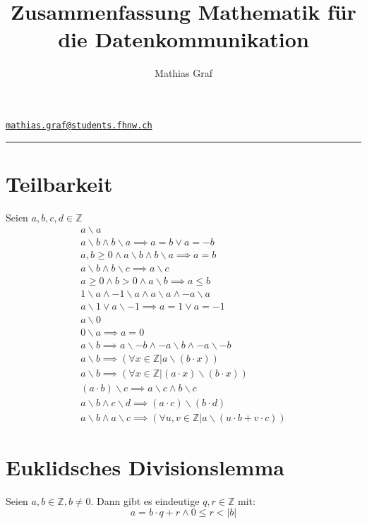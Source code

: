 \documentclass[a4paper, ngerman, landscape, fleqn]{article}
\title{Zusammenfassung Mathematik für die Datenkommunikation}
\author{Mathias Graf}
\makeatletter
\def\email{\href{mailto:mathias.graf@students.fhnw.ch}{\texttt{mathias.graf@students.fhnw.ch}}}
\makeatother
\begin{document}
\makeatletter
{\Large \textbf{\@title}}
\hfill
{\@author}
\hfill
\email
\makeatother
\hrule

\begin{multicols*}{3}

\section*{Teilbarkeit}
Seien $a, b, c, d \in \mathbb{Z}$
\begin{align}
    a \backslash a \\
    a \backslash b \wedge b \backslash a \implies a = b \vee a = -b \\
    a, b \geq 0 \wedge a \backslash b \wedge b \backslash a \implies a = b \\
    a \backslash b \wedge b \backslash c \implies a \backslash c \\
    a \geq 0 \wedge b > 0 \wedge a \backslash b \implies a \leq b \\
    1 \backslash a \wedge -1 \backslash a \wedge a \backslash a \wedge -a \backslash a \\
    a \backslash 1 \vee a \backslash -1 \implies a = 1 \vee a = -1 \\
    a \backslash 0 \\
    0 \backslash a \implies a = 0 \\
    a \backslash b \implies a \backslash -b \wedge -a \backslash b \wedge -a \backslash -b \\
    a \backslash b \implies (\forall x \in \mathbb{Z} | a \backslash (b \cdot x)) \\
    a \backslash b \implies (\forall x \in \mathbb{Z} | (a \cdot x) \backslash (b \cdot x)) \\
    (a \cdot b) \backslash c \implies a \backslash c  \wedge b \backslash c \\
    a \backslash b \wedge c \backslash d \implies (a \cdot c) \backslash (b \cdot d) \\
    a \backslash b \wedge a \backslash c \implies (\forall u, v \in \mathbb{Z} | a \backslash (u \cdot b + v \cdot c))
\end{align}

\section*{Euklidsches Divisionslemma}
Seien $a, b \in \mathbb{Z}, b \neq 0$. Dann gibt es eindeutige $q, r \in \mathbb{Z}$ mit:
\begin{equation}
    a = b \cdot q + r \wedge 0 \leq r < | b | 
\end{equation}


\end{multicols*}
\end{document}
